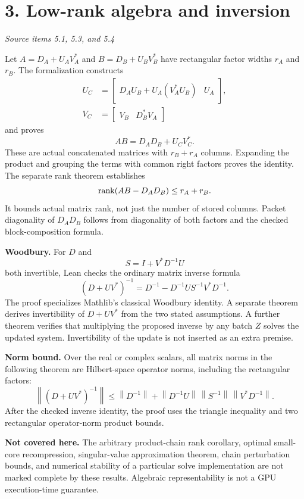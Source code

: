 \documentclass[11pt]{article}
\newcommand{\norm}[1]{\left\lVert#1\right\rVert}
\newcommand{\pageheading}[2]{\section*{\color{ink}#1}\textit{#2}\par}
\begin{document}
\newpage
\pageheading{3. Low-rank algebra and inversion}{Source items 5.1, 5.3, and 5.4}
Let $A=D_A+U_AV_A^*$ and $B=D_B+U_BV_B^*$ have rectangular factor widths $r_A$ and $r_B$. The formalization constructs
\begin{align*}
U_C&=\begin{bmatrix}D_AU_B+U_A(V_A^*U_B)&U_A\end{bmatrix},\\
V_C&=\begin{bmatrix}V_B&D_B^*V_A\end{bmatrix}
\end{align*}
and proves
\[
\boxed{AB=D_AD_B+U_CV_C^*.}
\]
These are actual concatenated matrices with $r_B+r_A$ columns. Expanding the product and grouping the terms with common right factors proves the identity. The separate rank theorem establishes
\[
\operatorname{rank}(AB-D_AD_B)\le r_A+r_B.
\]
It bounds actual matrix rank, not just the number of stored columns. Packet diagonality of $D_AD_B$ follows from diagonality of both factors and the checked block-composition formula.

\textbf{Woodbury.} For $D$ and
\[
S=I+V^*D^{-1}U
\]
both invertible, Lean checks the ordinary matrix inverse formula
\[
\boxed{(D+UV^*)^{-1}
=D^{-1}-D^{-1}US^{-1}V^*D^{-1}.}
\]
The proof specializes Mathlib's classical Woodbury identity. A separate theorem derives invertibility of $D+UV^*$ from the two stated assumptions. A further theorem verifies that multiplying the proposed inverse by any batch $Z$ solves the updated system. Invertibility of the update is not inserted as an extra premise.

\textbf{Norm bound.} Over the real or complex scalars, all matrix norms in the following theorem are Hilbert-space operator norms, including the rectangular factors:
\[
\boxed{
\norm{(D+UV^*)^{-1}}
\le\norm{D^{-1}}+
\norm{D^{-1}U}\,\norm{S^{-1}}\,\norm{V^*D^{-1}}.
}
\]
After the checked inverse identity, the proof uses the triangle inequality and two rectangular operator-norm product bounds.

\textbf{Not covered here.} The arbitrary product-chain rank corollary, optimal small-core recompression, singular-value approximation theorem, chain perturbation bounds, and numerical stability of a particular solve implementation are not marked complete by these results. Algebraic representability is not a GPU execution-time guarantee.
\end{document}
